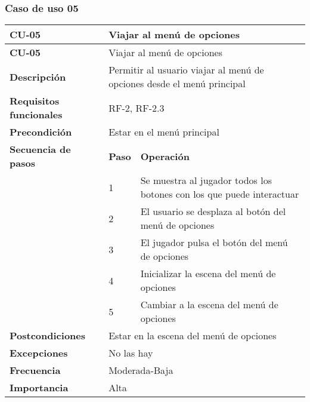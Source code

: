 \subsubsection{Caso de uso 05}
\begin{longtable}{lll}
\textbf{CU-05}                                   & \multicolumn{2}{l}{Viajar al menú de opciones}                                             \\ \hline
\endfirsthead
\textbf{CU-05}                                   & \multicolumn{2}{l}{Viajar al menú de opciones}                                             \\ \hline
\endhead
%
\textbf{Descripción}                             & \multicolumn{2}{l}{Permitir al usuario viajar al menú de opciones desde el menú principal} \\ \hline
\textbf{Requisitos funcionales}                  & \multicolumn{2}{l}{RF-2, RF-2.3}                                                           \\ \hline
\textbf{Precondición}                            & \multicolumn{2}{l}{Estar en el menú principal}                                             \\ \hline
\multicolumn{1}{l|}{\textbf{Secuencia de pasos}} & \textbf{Paso}    & \textbf{Operación}                                                      \\ \cline{2-3} 
\multicolumn{1}{l|}{}                            & 1                & Se muestra al jugador todos los botones con los que puede interactuar   \\
\multicolumn{1}{l|}{}                            & 2                & El usuario se desplaza al botón del menú de opciones                    \\
\multicolumn{1}{l|}{}                            & 3                & El jugador pulsa el botón del menú de opciones                          \\
\multicolumn{1}{l|}{}                            & 4                & Inicializar la escena del menú de opciones                              \\
\multicolumn{1}{l|}{}                                                 & 5                & Cambiar a la escena del menú de opciones                                \\ \hline
\textbf{Postcondiciones}                         & \multicolumn{2}{l}{Estar en la escena del menú de opciones}                                \\ \hline
\textbf{Excepciones}                             & \multicolumn{2}{l}{No las hay}                                                             \\ \hline
\textbf{Frecuencia}                              & \multicolumn{2}{l}{Moderada-Baja}                                                          \\ \hline
\textbf{Importancia}                             & \multicolumn{2}{l}{Alta}                                                                   \\ \hline
\end{longtable}

